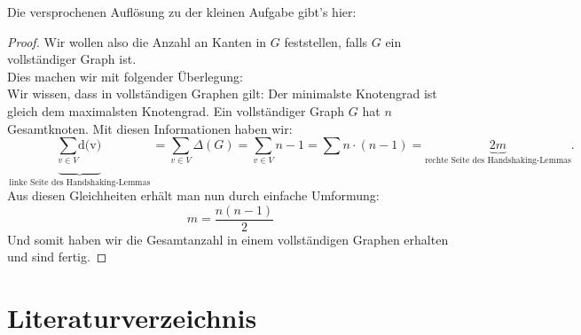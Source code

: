 \documentclass{article}
\theoremstyle{plain}
\begin{document}
\begin{small}
	Die versprochenen Auflösung zu der kleinen Aufgabe gibt's hier:\\
	\begin{proof}
		Wir wollen also die Anzahl an Kanten in $G$ feststellen, falls $G$ ein vollständiger Graph ist.\\
		Dies machen wir mit folgender Überlegung:\\
		Wir wissen, dass in vollständigen Graphen gilt: Der minimalste Knotengrad ist gleich dem maximalsten Knotengrad. Ein vollständiger Graph $G$ hat $n$ Gesamtknoten. Mit diesen Informationen haben wir:\\
		\begin{equation*}
			\underbrace{\sum_{v \in V} \text{d(v)}}_{\text{linke Seite des Handshaking-Lemmas}} = \sum_{v \in V}\Delta(G) = \sum_{v \in V} n - 1 = \sum n \cdot (n - 1) = \underbrace{2m}_{\text{rechte Seite des Handshaking-Lemmas}}.
		\end{equation*}
		Aus diesen Gleichheiten erhält man nun durch einfache Umformung:\\
		$$m = \frac{n(n - 1)}{2}$$
		Und somit haben wir die Gesamtanzahl in einem vollständigen Graphen erhalten und sind fertig.
	\end{proof}
\end{small}
\newpage
\section{Literaturverzeichnis}



\end{document}
